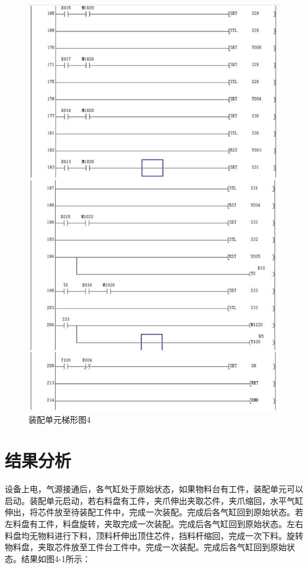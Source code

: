 \documentclass[12pt]{article}
\begin{document}
\begin{figure}[htbp]
    \centering
    \includegraphics[scale=0.95]{fig/PLC4.png}
    \caption{装配单元梯形图4}
\end{figure} 
\pagebreak

\section{结果分析}
设备上电，气源接通后，各气缸处于原始状态，如果物料台有工件，装配单元可以启动。装配单元启动，若右料盘有工件，夹爪伸出夹取芯件，夹爪缩回，水平气缸伸出，将芯件放至待装配工件中，完成一次装配。完成后各气缸回到原始状态。若左料盘有工件，料盘旋转，夹取完成一次装配。完成后各气缸回到原始状态。左右料盘均无物料进行下料，顶料杆伸出顶住芯件，挡料杆缩回，完成一次下料。旋转物料盘，夹取芯件放至工件台工件中。完成一次装配。完成后各气缸回到原始状态。结果如图4-1所示：
\end{document}
